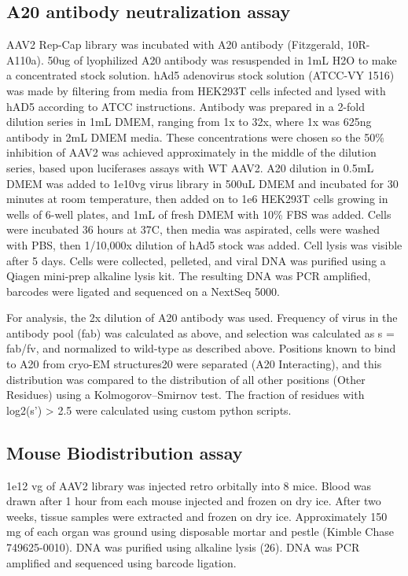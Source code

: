 \subsection{A20 antibody neutralization assay}
AAV2 Rep-Cap library was incubated with A20 antibody (Fitzgerald, 10R-A110a). 50ug of lyophilized A20 antibody was resuspended in 1mL H2O to make a concentrated stock solution. hAd5 adenovirus stock solution (ATCC-VY 1516) was made by filtering from media from HEK293T cells infected and lysed with hAD5 according to ATCC instructions. Antibody was prepared in a 2-fold dilution series in 1mL DMEM, ranging from 1x to 32x, where 1x was 625ng antibody in 2mL DMEM media. These concentrations were chosen so the 50\% inhibition of AAV2 was achieved approximately in the middle of the dilution series, based upon luciferases assays with WT AAV2. A20 dilution in 0.5mL DMEM was added to 1e10vg virus library in 500uL DMEM and incubated for 30 minutes at room temperature, then added on to 1e6 HEK293T cells growing in wells of 6-well plates, and 1mL of fresh DMEM with 10\% FBS was added. Cells were incubated 36 hours at 37C, then media was aspirated, cells were washed with PBS, then 1/10,000x dilution of hAd5 stock was added. Cell lysis was visible after 5 days. Cells were collected, pelleted, and viral DNA was purified using a Qiagen mini-prep alkaline lysis kit. The resulting DNA was PCR amplified, barcodes were ligated and sequenced on a NextSeq 5000. 

For analysis, the 2x dilution of A20 antibody was used. Frequency of virus in the antibody pool (fab) was calculated as above, and selection was calculated as s = fab/fv, and normalized to wild-type as described above. Positions known to bind to A20 from cryo-EM structures20 were separated (A20 Interacting), and this distribution was compared to the distribution of all other positions (Other Residues) using a Kolmogorov–Smirnov test. The fraction of residues with log2(s’) > 2.5 were calculated using custom python scripts.  

\subsection{Mouse Biodistribution assay}
1e12 vg of AAV2 library was injected retro orbitally into 8 mice. Blood was drawn after 1 hour from each mouse injected and frozen on dry ice. After two weeks, tissue samples were extracted and frozen on dry ice. Approximately 150 mg of each organ was ground using disposable mortar and pestle (Kimble Chase 749625-0010). DNA was purified using alkaline lysis (26). DNA was PCR amplified and sequenced using barcode ligation.

